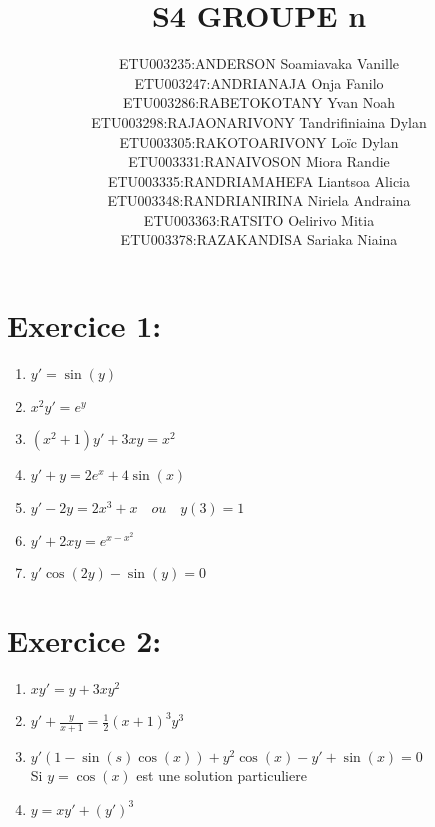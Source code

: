\documentclass[a4paper,12pt]{article}
\begin{document}
	
\title{\textbf{S4 GROUPE n}}
\author{		
	\begin{tabular}{rl}
		ETU003235: & ANDERSON Soamiavaka Vanille \\	
		ETU003247: & ANDRIANAJA Onja Fanilo \\
		ETU003286: & RABETOKOTANY Yvan Noah \\
		ETU003298: & RAJAONARIVONY Tandrifiniaina Dylan \\
		ETU003305: & RAKOTOARIVONY Loïc Dylan \\
		ETU003331: & RANAIVOSON Miora Randie \\
		ETU003335: & RANDRIAMAHEFA Liantsoa Alicia \\
		ETU003348: & RANDRIANIRINA Niriela Andraina \\
		ETU003363: & RATSITO Oelirivo Mitia \\
		ETU003378: & RAZAKANDISA Sariaka Niaina \\
	\end{tabular}
}
\date{}
\maketitle

\newpage
\section*{Exercice 1:}
\begin{enumerate}
	\item $y\prime = \sin(y)$
	\item $x^2 y\prime = e^y$
	\item $(x^2 + 1) y\prime + 3xy = x^2$
	\item $y\prime + y = 2e^x + 4 \sin(x)$
	\item $y\prime - 2y = 2x^3 + x \quad ou \quad y(3)=1$
	\item $y\prime + 2xy = e^{x-x^2}$
	\item $y\prime \cos(2y) - \sin(y) = 0$
\end{enumerate}

\section*{Exercice 2:}
\begin{enumerate}
	\item $xy\prime = y + 3xy^2$
	\item $y\prime + \frac{y}{x+1} = \frac{1}{2} (x+1)^3 y^3$
	\item $y\prime (1 -\sin(s)\cos(x)) + y^2\cos(x) -y\prime + \sin(x) = 0$ \\Si $y = \cos(x)$ est une solution particuliere
	\item $y = xy\prime + (y\prime)^3$
\end{enumerate}
\end{document}
